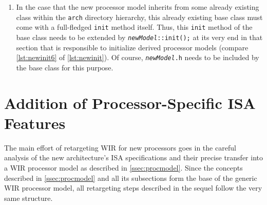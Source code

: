 \begin{enumerate}[resume]
\begin{lstlisting}[style=code,float=!b,caption={Extension of function \texttt{WIR\_Init}},label=lst:newwirinit]
// Include WIR headers
[...]
^#include^ §<arch/Ü{\itshape\color{orange}archDir}Ü/Ü{\itshape\color{orange}newModel}Ü.h>§Ü\label{lst:newwirinit1}Ü

// WIR_Init performs some global initialization tasks for the entire WIR library.
@void@ WIR_Init@( void )@Ü\label{lst:newwirinit2}Ü
{
  [...]

  // Initialize WIR processor models.Ü\label{lst:newwirinit3}Ü
  ARMv4::init@()@;
  MIPS::init@()@;
  RV32I::init@()@;
  TC13::init@()@;
  Ü{\itshape newModel}Ü::init@()@;Ü\label{lst:newwirinit4}Ü
};
\end{lstlisting}

  In order to introduce the new processor model to \texttt{WIR\_init}, its header file \texttt{{\itshape newModel}.h} has to be included at the top of file \texttt{wirmisc.cc} (cf. \cref{lst:newwirinit1}).

  \item In the case that the new processor model inherits from some already existing class within the \texttt{arch} directory hierarchy, this already existing base class must come with a full-fledged \texttt{init} method itself.
  Thus, this \texttt{init} method of the base class needs to be extended by \texttt{{\itshape newModel}::init();} at its very end in that section that is responsible to initialize derived processor models (compare \cref{lst:newinit6} of \cref{lst:newinit}).
  Of course, \texttt{{\itshape newModel}.h} needs to be included by the base class for this purpose.
\end{enumerate}


\section{Addition of Processor-Specific ISA Features}
\label{sec:newisa}

The main effort of retargeting \gls{WIR} for new processors goes in the careful analysis of the new architecture's \gls{ISA} specifications and their precise transfer into a \gls{WIR} processor model as described in \cref{ssec:procmodel}.
Since the concepts described in \cref{ssec:procmodel} and all its subsections form the base of the generic \gls{WIR} processor model, all retargeting steps described in the sequel follow the very same structure.


